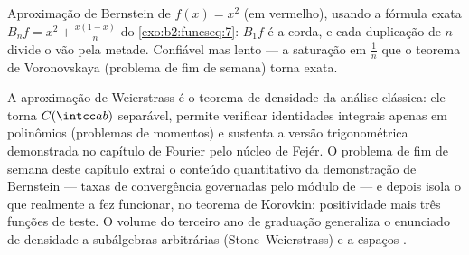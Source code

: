 \begin{omfigure}

{\small Aproximação de Bernstein de $f(x) = x^2$ (em vermelho), usando
a fórmula exata $B_nf = x^2 + \frac{x(1-x)}{n}$ do
\cref{exo:b2:funcseq:7}: $B_1f$ é a corda, e cada duplicação
de $n$ divide o vão pela metade. Confiável mas lento --- a
saturação em $\frac1n$ que o teorema de Voronovskaya (problema de
fim de semana) torna exata.}
\end{omfigure}

\begin{remark}
A aproximação de Weierstrass é o teorema de densidade da análise
clássica: ele torna $C(\intcc ab)$ separável, permite verificar
identidades integrais apenas em polinômios (problemas de momentos) e
sustenta a versão trigonométrica demonstrada no capítulo de Fourier
pelo núcleo de Fejér. O problema de fim de semana deste
capítulo extrai o conteúdo quantitativo da demonstração de Bernstein
--- taxas de convergência governadas pelo módulo de  ---
e depois isola o que realmente a fez funcionar, no teorema de
Korovkin: positividade mais três funções de teste. O volume do terceiro ano de
graduação generaliza o enunciado de densidade a subálgebras
arbitrárias (Stone--Weierstrass) e a espaços .
\end{remark}

